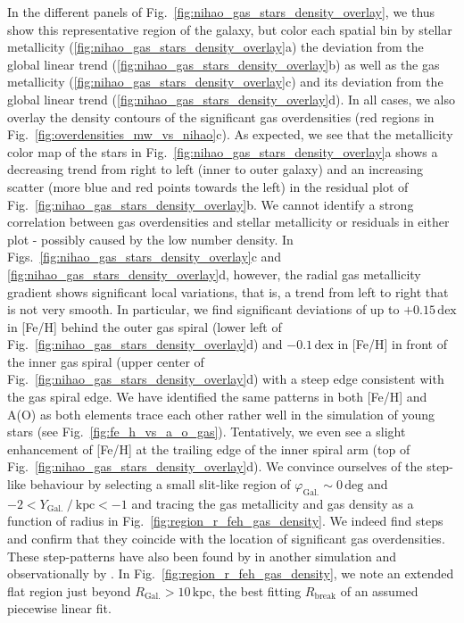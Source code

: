 \documentclass[twocolumn,apj,numberedappendix,appendixfloats]{openjournal}
\begin{document}
\begin{CJK*}{UTF8}{gbsn}
In the different panels of Fig.~\ref{fig:nihao_gas_stars_density_overlay}, we thus show this representative region of the galaxy, but color each spatial bin by stellar metallicity (\ref{fig:nihao_gas_stars_density_overlay}a) the deviation from the global linear trend (\ref{fig:nihao_gas_stars_density_overlay}b) as well as the gas metallicity (\ref{fig:nihao_gas_stars_density_overlay}c) and its deviation from the global linear trend (\ref{fig:nihao_gas_stars_density_overlay}d). In all cases, we also overlay the density contours of the significant gas overdensities (red regions in Fig.~\ref{fig:overdensities_mw_vs_nihao}c). As expected, we see that the metallicity color map of the stars in Fig.~\ref{fig:nihao_gas_stars_density_overlay}a shows a decreasing trend from right to left (inner to outer galaxy) and an increasing scatter (more blue and red points towards the left) in the residual plot of Fig.~\ref{fig:nihao_gas_stars_density_overlay}b. We cannot identify a strong correlation between gas overdensities and stellar metallicity or residuals in either plot - possibly caused by the low number density. In Figs.~\ref{fig:nihao_gas_stars_density_overlay}c and \ref{fig:nihao_gas_stars_density_overlay}d, however, the radial gas metallicity gradient shows significant local variations, that is, a trend from left to right that is not very smooth. In particular, we find significant deviations of up to $+0.15\,\mathrm{dex}$ in [Fe/H] behind the outer gas spiral (lower left of Fig.~\ref{fig:nihao_gas_stars_density_overlay}d) and $-0.1\,\mathrm{dex}$ in [Fe/H] in front of the inner gas spiral (upper center of Fig.~\ref{fig:nihao_gas_stars_density_overlay}d) with a steep edge consistent with the gas spiral edge. We have identified the same patterns in both [Fe/H] and A(O) as both elements trace each other rather well in the simulation of young stars (see Fig.~\ref{fig:fe_h_vs_a_o_gas}). Tentatively, we even see a slight enhancement of [Fe/H] at the trailing edge of the inner spiral arm (top of Fig.~\ref{fig:nihao_gas_stars_density_overlay}d). We convince ourselves of the step-like behaviour by selecting a small slit-like region of $\varphi_\mathrm{Gal.} \sim 0\,\mathrm{deg}$ and $-2 < Y_\mathrm{Gal.}~/~\mathrm{kpc} < -1$ and tracing the gas metallicity and gas density as a function of radius in Fig.~\ref{fig:region_r_feh_gas_density}. We indeed find steps and confirm that they coincide with the location of significant gas overdensities. These step-patterns have also been found by \citet{Grand2015} in another simulation and observationally by \citet{Ho2017c}. In Fig.~\ref{fig:region_r_feh_gas_density}, we note an extended flat region just beyond $R_\mathrm{Gal.} > 10\,\mathrm{kpc}$, the best fitting $R_\mathrm{break}$ of an assumed piecewise linear fit.


\end{CJK*}
\end{document}
